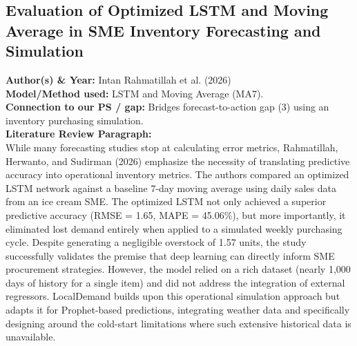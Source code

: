 \documentclass[conference]{IEEEtran}
\begin{document}
\subsection{Evaluation of Optimized LSTM and Moving Average in SME Inventory Forecasting and Simulation}
\textbf{Author(s) \& Year:} Intan Rahmatillah et al. (2026)\\
\textbf{Model/Method used:} LSTM and Moving Average (MA7).\\
\textbf{Connection to our PS / gap:} Bridges forecast-to-action gap (3) using an inventory purchasing simulation.\\
\textbf{Literature Review Paragraph:}\\
While many forecasting studies stop at calculating error metrics, Rahmatillah, Herwanto, and Sudirman (2026) emphasize the necessity of translating predictive accuracy into operational inventory metrics. The authors compared an optimized LSTM network against a baseline 7-day moving average using daily sales data from an ice cream SME. The optimized LSTM not only achieved a superior predictive accuracy (RMSE = 1.65, MAPE = 45.06\%), but more importantly, it eliminated lost demand entirely when applied to a simulated weekly purchasing cycle. Despite generating a negligible overstock of 1.57 units, the study successfully validates the premise that deep learning can directly inform SME procurement strategies. However, the model relied on a rich dataset (nearly 1,000 days of history for a single item) and did not address the integration of external regressors. LocalDemand builds upon this operational simulation approach but adapts it for Prophet-based predictions, integrating weather data and specifically designing around the cold-start limitations where such extensive historical data is unavailable.
\end{document}
